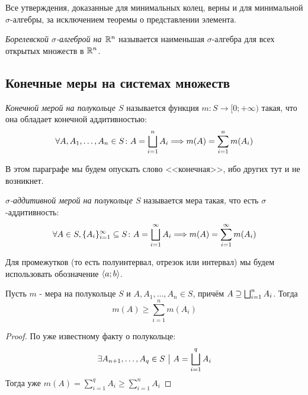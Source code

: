 \begin{note}
	Все утверждения, доказанные для минимальных колец, верны и для минимальной $\sigma$-алгебры, за исключением теоремы о представлении элемента.
\end{note}

\begin{definition}
	\textit{Борелевской $\sigma$-алгеброй на $\mathbb{R}^n$} называется наименьшая $\sigma$-алгебра для всех открытых множеств в $\mathbb{R}^n$.
\end{definition}

\subsection{Конечные меры на системах множеств}

\begin{definition}
	\textit{Конечной мерой на полукольце $S$} называется функция $m \colon S \to [0; +\infty)$ такая, что она обладает конечной аддитивностью:
	\[
		\forall A, A_1, \ldots, A_n \in S \colon A = \bigsqcup_{i = 1}^n A_i \Longrightarrow m(A) = \sum_{i = 1}^n m(A_i)
	\]
\end{definition}

\begin{note}
	В этом параграфе мы будем опускать слово <<конечная>>, ибо других тут и не возникнет.
\end{note}

\begin{definition}
	\textit{$\sigma$-аддитивной мерой на полукольце $S$} называется мера такая, что есть $\sigma$-аддитивность:
	\[
		\forall A \in S, \{A_i\}_{i = 1}^\infty \subseteq S \colon A = \bigsqcup_{i = 1}^\infty A_i \Longrightarrow m(A) = \sum_{i = 1}^\infty m(A_i)
	\]
\end{definition}

\begin{note}
	Для промежутков (то есть полуинтервал, отрезок или интервал) мы будем использовать обозначение $\left\langle a; b\right\rangle$.
\end{note}

\begin{lemma}
	Пусть $m$ - мера на полукольце $S$ и $A, A_1, \ldots, A_n \in S$, причём $A \supseteq \bigsqcup_{i = 1}^n A_i$. Тогда
	\[
		m(A) \ge \sum_{i = 1}^n m(A_i)
	\]
\end{lemma}

\begin{proof}
	По уже известному факту о полукольце:
	\[
		\exists A_{n + 1}, \ldots, A_q \in S \ \big|\  A = \bigsqcup_{i = 1}^q A_i
	\]
	Тогда уже $m(A) = \sum_{i = 1}^q A_i \ge \sum_{i = 1}^n A_i$
\end{proof}


